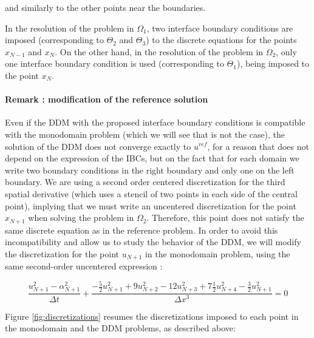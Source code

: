 \noindent and similarly to the other points near the boundaries.

\indent In the resolution of the problem in $\Omega_1$, two interface boundary conditions are imposed (corresponding to $\Theta_2$ and $\Theta_3$) to the discrete equations for the points $x_{N-1}$ and $x_N$. On the other hand, in the resolution of the problem in $\Omega_2$, only one interface boundary condition is used (corresponding to $\Theta_1$), being imposed to the point $x_N$.

\paragraph{Remark : modification of the reference solution}

\indent  Even if the DDM with the proposed interface boundary conditions is compatible with the monodomain problem (which we will see that is not the case), the solution of the DDM does not converge exactly to $u^{ref}$, for a reason that does not depend on the expression of the IBCs, but on the fact that for each domain we write two boundary conditions in the right boundary and only one on the left boundary. We are using a second order centered discretization for the third spatial derivative (which uses a stencil of two points in each side of the central point), implying that we must write an uncentered discretization for the point $x_{N+1}$ when solving the problem in $\Omega_2$. Therefore, this point does not satisfy the same discrete equation as in the reference problem. In order to avoid this incompatibility and allow us to study the behavior of the DDM, we will modify the discretization for the point $u_{N+1}$ in the monodomain problem, using the same second-order uncentered expression :

\begin{equation*}
    \frac{u_{N+1}^2 - \alpha_{N+1}^2}{\Delta t} + \frac{-\frac{5}{2}u_{N+1}^2 + 9u_{N+2}^2 - 12 u_{N+3}^2 + 7\frac{1}{2}u_{N+4}^2 -\frac{3}{2}u_{N+1}^2}{\Delta x ^3} = 0
\end{equation*}

\indent Figure \ref{fig:discretizations} resumes the discretizations imposed to each point in the monodomain and the DDM problems, as described above:

\indent 

